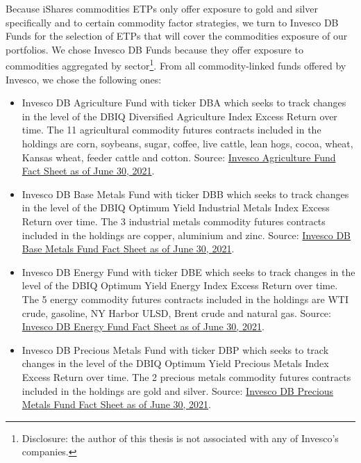     Because iShares commodities ETPs only offer exposure to gold and silver specifically and to certain commodity factor strategies, we turn to Invesco DB Funds for the selection of ETPs that will cover the commodities exposure of our portfolios. We chose Invesco DB Funds because they offer exposure to commodities aggregated by sector\footnote{Disclosure: the author of this thesis is not associated with any of Invesco's companies.}. From all commodity-linked funds offered by Invesco, we chose the following ones:
    \begin{itemize}
        \item Invesco DB Agriculture Fund with ticker DBA which seeks to track changes in the level of the DBIQ Diversified Agriculture Index Excess Return over time. The 11 agricultural commodity futures contracts included in the holdings are corn, soybeans, sugar, coffee, live cattle, lean hogs, cocoa, wheat, Kansas wheat, feeder cattle and cotton. Source: \href{https://www.invesco.com/us-rest/contentdetail?contentId=f919e01e98630410VgnVCM10000046f1bf0aRCRD&dnsName=us}{Invesco Agriculture Fund Fact Sheet as of June 30, 2021}.%
        
        \item Invesco DB Base Metals Fund with ticker DBB which seeks to track changes in the level of the DBIQ Optimum Yield Industrial Metals Index Excess Return over time. The 3 industrial metals commodity futures contracts included in the holdings are copper, aluminium and zinc. Source: \href{https://www.invesco.com/us-rest/contentdetail?contentId=3919e01e98630410VgnVCM10000046f1bf0aRCRD&dnsName=us}{Invesco DB Base Metals Fund Fact Sheet as of June 30, 2021}.%
        
        \item Invesco DB Energy Fund with ticker DBE which seeks to track changes in the level of the DBIQ Optimum Yield Energy Index Excess Return over time. The 5 energy commodity futures contracts included in the holdings are WTI crude, gasoline, NY Harbor ULSD, Brent crude and natural gas. Source: \href{https://www.invesco.com/us-rest/contentdetail?contentId=7519e01e98630410VgnVCM10000046f1bf0aRCRD&dnsName=us}{Invesco DB Energy Fund Fact Sheet as of June 30, 2021}.%
        
        \item Invesco DB Precious Metals Fund with ticker DBP which seeks to track changes in the level of the DBIQ Optimum Yield Precious Metals Index Excess Return over time. The 2 precious metals commodity futures contracts included in the holdings are gold and silver. Source: \href{https://www.invesco.com/us-rest/contentdetail?contentId=f619e01e98630410VgnVCM10000046f1bf0aRCRD&dnsName=us}{Invesco DB Precious Metals Fund Fact Sheet as of June 30, 2021}.%
    \end{itemize}
    
